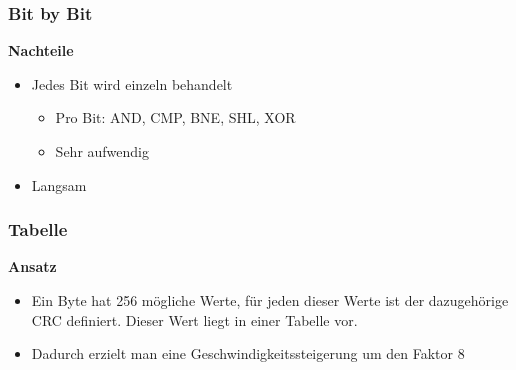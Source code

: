 \subsubsection{Bit by Bit}


\textbf{Nachteile}
\begin{itemize}
	\item Jedes Bit wird einzeln behandelt
	\begin{itemize}
		\item Pro Bit: AND, CMP, BNE, SHL, XOR
		\item Sehr aufwendig	
	\end{itemize}
	\item Langsam
\end{itemize}


\subsubsection{Tabelle}
\textbf{Ansatz}
\begin{itemize}
	\item Ein Byte hat 256 mögliche Werte, für jeden dieser Werte ist der dazugehörige CRC definiert. Dieser Wert liegt in einer Tabelle vor.
	\item Dadurch erzielt man eine Geschwindigkeitssteigerung um den Faktor 8	
\end{itemize}

